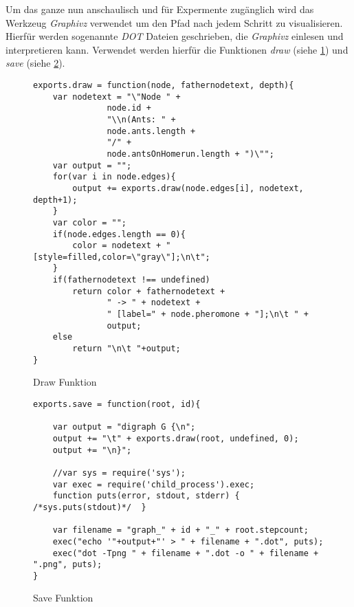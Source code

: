 Um das ganze nun anschaulisch und für Expermente zugänglich wird das
Werkzeug \emph{Graphivz} verwendet um den Pfad nach jedem Schritt zu
visualisieren. Hierfür werden sogenannte \emph{DOT} Dateien
geschrieben, die \emph{Graphivz} einlesen und interpretieren
kann. Verwendet werden hierfür die Funktionen \emph{draw} (siehe
\ref{fig:drawfn}) und \emph{save} (siehe \ref{fig:savefn}).

\begin{figure}[htbp]
  \centering
  \begin{lstlisting}
exports.draw = function(node, fathernodetext, depth){
    var nodetext = "\"Node " +
               node.id +
               "\\n(Ants: " +
               node.ants.length +
               "/" +
               node.antsOnHomerun.length + ")\"";
    var output = "";
    for(var i in node.edges){
        output += exports.draw(node.edges[i], nodetext, depth+1);
    }
    var color = "";
    if(node.edges.length == 0){
        color = nodetext + " [style=filled,color=\"gray\"];\n\t";
    }
    if(fathernodetext !== undefined)
        return color + fathernodetext +
               " -> " + nodetext +
               " [label=" + node.pheromone + "];\n\t " +
               output;
    else
        return "\n\t "+output;
}
  \end{lstlisting}
  \caption{Draw Funktion}
  \label{fig:drawfn}
\end{figure}

\begin{figure}[htbp]
  \centering
  \begin{lstlisting}
exports.save = function(root, id){

    var output = "digraph G {\n";
    output += "\t" + exports.draw(root, undefined, 0);
    output += "\n}";

    //var sys = require('sys');
    var exec = require('child_process').exec;
    function puts(error, stdout, stderr) { /*sys.puts(stdout)*/  }

    var filename = "graph_" + id + "_" + root.stepcount;
    exec("echo '"+output+"' > " + filename + ".dot", puts);
    exec("dot -Tpng " + filename + ".dot -o " + filename + ".png", puts);
}
  \end{lstlisting}
  \caption{Save Funktion}
  \label{fig:savefn}
\end{figure}
